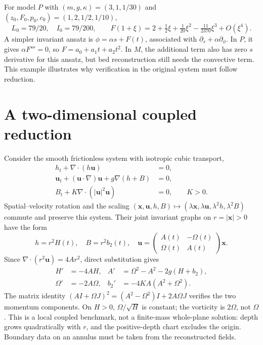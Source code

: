 \documentclass[11pt,a4paper,oneside]{report}
\numberwithin{equation}{chapter}
\begin{document}
For model $P$ with $(m,g,\kappa)=(3,1,1/30)$ and $(z_0,F_0,p_0,c_0)=(1,2,1/2,1/10)$,
\begin{equation}\label{eq:taylor-example}
L_0=79/20,\quad I_0=79/200,\qquad
F(1+\xi)=2+\tfrac12\xi+\tfrac1{20}\xi^2-\tfrac{11}{2370}\xi^3+O(\xi^4).
\end{equation}
A simpler invariant ansatz is $\phi=\alpha s+F(t)$, associated with $\partial_s+\alpha\partial_\phi$. In $P$, it gives $\alpha F'''=0$, so $F=a_0+a_1t+a_2t^2$. In $M$, the additional term also has zero $s$ derivative for this ansatz, but bed reconstruction still needs the convective term. This example illustrates why verification in the original system must follow reduction.

\section{A two-dimensional coupled reduction}\label{sec:2d}
Consider the smooth frictionless system with isotropic cubic transport,
\begin{equation}\label{eq:2dsystem}
\begin{aligned}
h_t+\nabla\cdot(h\mathbf u)&=0,\\
\mathbf u_t+(\mathbf u\cdot\nabla)\mathbf u+g\nabla(h+B)&=0,\\
B_t+K\nabla\cdot(|\mathbf u|^2\mathbf u)&=0,\qquad K>0.
\end{aligned}
\end{equation}
Spatial--velocity rotation and the scaling
$(\mathbf x,\mathbf u,h,B)\mapsto(\lambda\mathbf x,\lambda\mathbf u,\lambda^2h,\lambda^2B)$ commute and preserve this system. Their joint invariant graphs on $r=|\mathbf x|>0$ have the form
\begin{equation}\label{eq:2dansatz}
h=r^2H(t),\quad B=r^2b_2(t),\quad
\mathbf u=\begin{pmatrix}A(t)&-\Omega(t)\\\Omega(t)&A(t)\end{pmatrix}\mathbf x.
\end{equation}
Since $\nabla\cdot(r^2\mathbf u)=4Ar^2$, direct substitution gives
\begin{equation}\label{eq:2dode}
\begin{aligned}
H'&=-4AH,& A'&=\Omega^2-A^2-2g(H+b_2),\\
\Omega'&=-2A\Omega,& b_2'&=-4KA(A^2+\Omega^2).
\end{aligned}
\end{equation}
The matrix identity $(AI+\Omega J)^2=(A^2-\Omega^2)I+2A\Omega J$ verifies the two momentum components. On $H>0$, $\Omega/\sqrt H$ is constant; the vorticity is $2\Omega$, not $\Omega$. This is a local coupled benchmark, not a finite-mass whole-plane solution: depth grows quadratically with $r$, and the positive-depth chart excludes the origin. Boundary data on an annulus must be taken from the reconstructed fields.
\end{document}
